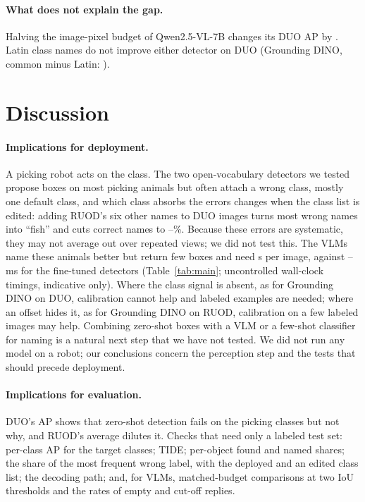 \documentclass[letterpaper]{article} %
\begin{document}
\paragraph{What does not explain the gap.}
Halving the image-pixel budget of Qwen2.5-VL-7B changes its DUO AP by \dResolution{} \dciResolution. Latin class names do not improve either detector on DUO (Grounding DINO, common minus Latin: \dLatinGd{} \dciLatinGd).

\section{Discussion}
\label{sec:discussion}

\paragraph{Implications for deployment.}
A picking robot acts on the class. The two open-vocabulary detectors we tested propose boxes on most picking animals but often attach a wrong class, mostly one default class, and which class absorbs the errors changes when the class list is edited: adding RUOD's six other names to DUO images turns most wrong names into ``fish'' and cuts correct names to \fvNamedGDten--\fvNamedOWLten\%. Because these errors are systematic, they may not average out over repeated views; we did not test this. The VLMs name these animals better but return few boxes and need \secQwenVLmean{} s per image, against \msYoloMin--\msYoloMax{} ms for the fine-tuned detectors (Table~\ref{tab:main}; uncontrolled wall-clock timings, indicative only). Where the class signal is absent, as for Grounding DINO on DUO, calibration cannot help and labeled examples are needed; where an offset hides it, as for Grounding DINO on RUOD, calibration on a few labeled images may help. Combining zero-shot boxes with a VLM or a few-shot classifier for naming is a natural next step that we have not tested. We did not run any model on a robot; our conclusions concern the perception step and the tests that should precede deployment.

\paragraph{Implications for evaluation.}
DUO's AP shows that zero-shot detection fails on the picking classes but not why, and RUOD's average dilutes it. Checks that need only a labeled test set: per-class AP for the target classes; TIDE; per-object found and named shares; the share of the most frequent wrong label, with the deployed and an edited class list; the decoding path; and, for VLMs, matched-budget comparisons at two IoU thresholds and the rates of empty and cut-off replies.
\end{document}
